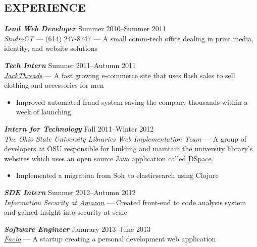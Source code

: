 \documentclass[line,letterpaper]{resume}
\begin{document}
\begin{resume}
    \section{\uppercase{Experience}} {\sl\textbf{Lead Web Developer}} \hfill
    Summer 2010--Summer 2011\\
    \emph{StudioCT} --- (614) 247-8747 --- A small comm-tech office dealing
    in print media, identity, and website solutions

    \vspace{-6pt}
    {\sl\textbf{Tech Intern}} \hfill Summer 2011--Autumn 2011\\
    \emph{\underline{\href{http://www.jackthreads.com/}{JackThreads}}}
    --- A fast growing e-commerce site that uses flash sales to sell clothing and
    accessories for men
    \begin{itemize}
        \item Improved automated fraud system saving the company
            thousands within a week of launching.
    \end{itemize}
    \vspace{-6pt}
    {\sl\textbf{Intern for Technology}} \hfill Fall 2011--Winter 2012\\
    \emph{The Ohio State University Libraries Web Implementation Team} --- A
    group of developers at OSU responsible for building and maintain the
    university library's websites which uses an open source Java application
    called
    \underline{\href{https://github.com/osulibraries/DSpaceOSUKB/wiki}{DSpace}}.
    \begin{itemize}
        \item Implemented a migration from Solr to elasticsearch using Clojure
    \end{itemize}

    \vspace{-6pt}
    {\sl\textbf{SDE Intern}} \hfill Summer 2012--Autumn 2012\\
    \emph{Information Security at
    \underline{\href{http://www.amazon.com/}{Amazon}}} --- Created front-end to
    code analysis system and gained insight into security at scale
    \vspace{-6pt}

    {\sl\textbf{Software Engineer}} \hfill Janurary 2013--June 2013\\
    \emph{\underline{\href{http://www.facio.com/}{Facio}}} ---
    A startup creating a personal development web application
    \vspace{-6pt}


\end{resume}
\end{document}
